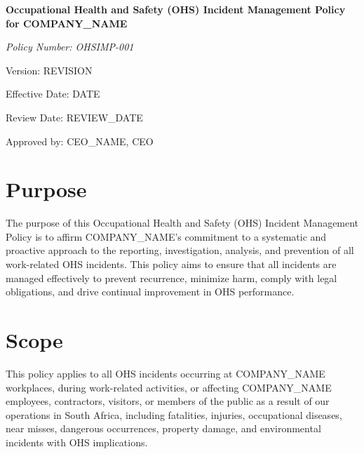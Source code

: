 \documentclass[12pt]{article}
\begin{document}
\begin{titlepage}
    \centering
    \vspace*{2cm}
    {\LARGE\bfseries Occupational Health and Safety (OHS) Incident Management Policy for {{COMPANY_NAME}}\par}
    \vspace{1cm}
    {\large\itshape Policy Number: OHSIMP-001\par}
    \vspace{0.5cm}
    {\normalsize Version: {{REVISION}}\par}
    \vspace{0.5cm}
    {\normalsize Effective Date: {{DATE}}\par}
    \vspace{0.5cm}
    {\normalsize Review Date: {{REVIEW_DATE}}\par}
    \vspace{2cm}
    {\normalsize Approved by: {{CEO_NAME}}, CEO\par}
\end{titlepage}

\section{Purpose}
The purpose of this Occupational Health and Safety (OHS) Incident Management Policy is to affirm {{COMPANY_NAME}}'s commitment to a systematic and proactive approach to the reporting, investigation, analysis, and prevention of all work-related OHS incidents. This policy aims to ensure that all incidents are managed effectively to prevent recurrence, minimize harm, comply with legal obligations, and drive continual improvement in OHS performance.

\section{Scope}
This policy applies to all OHS incidents occurring at {{COMPANY_NAME}} workplaces, during work-related activities, or affecting {{COMPANY_NAME}} employees, contractors, visitors, or members of the public as a result of our operations in South Africa, including fatalities, injuries, occupational diseases, near misses, dangerous occurrences, property damage, and environmental incidents with OHS implications.
\end{document}
